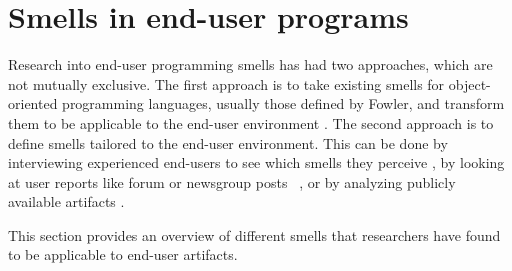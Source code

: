 \documentclass[10pt,conference,compsocconf]{IEEEtran}
\begin{document}
\section{Smells in end-user programs}
\label{sec:smells}
Research into end-user programming smells has had two approaches, which are not mutually exclusive.
The first approach is to take existing smells for object-oriented programming languages, usually those defined by Fowler, and transform them to be applicable to the end-user environment \cite{Hermans2012inter,Hermans2012intra,Stolee2011,StoleeTSE2013}.
The second approach is to define smells tailored to the end-user environment.
This can be done by interviewing experienced end-users to see which smells they perceive \cite{chambers2013smell}, by looking at user reports like forum or newsgroup posts~ \cite{badame2012refactoring,chambers2013smell}, or by analyzing publicly available artifacts \cite{Stolee2011,StoleeTSE2013}.

This section provides an overview of different smells that researchers have found to be applicable to end-user artifacts.
\end{document}
